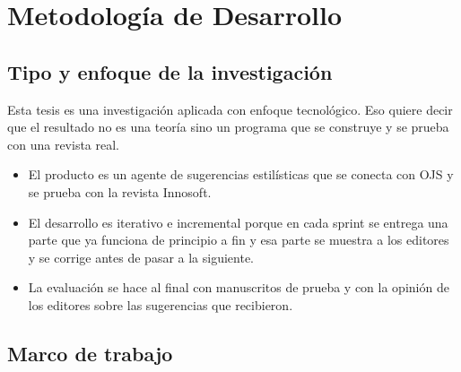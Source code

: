 
\chapter{Metodología de Desarrollo}\label{cap:metodologia}


\section{Tipo y enfoque de la investigación}

Esta tesis es una investigación aplicada con enfoque tecnológico. Eso quiere decir que el resultado no es una teoría sino un programa que se construye y se prueba con una revista real.

\begin{itemize}
  \item El producto es un agente de sugerencias estilísticas que se conecta con OJS y se prueba con la revista Innosoft.
  \item El desarrollo es iterativo e incremental porque en cada sprint se entrega una parte que ya funciona de principio a fin y esa parte se muestra a los editores y se corrige antes de pasar a la siguiente.
  \item La evaluación se hace al final con manuscritos de prueba y con la opinión de los editores sobre las sugerencias que recibieron.
\end{itemize}

\section{Marco de trabajo}

